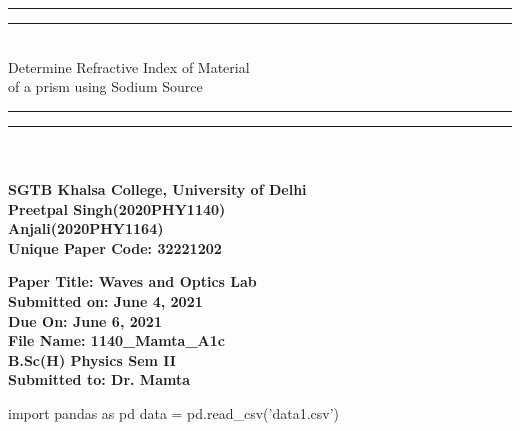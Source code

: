 \documentclass{article}
\begin{document}
\begin{center}


\rule{\textwidth}{1.6pt}\vspace*{-\baselineskip}\vspace*{2pt} %
\rule{\textwidth}{0.4pt}\\[\baselineskip] %

{\LARGE Determine Refractive Index of Material \\[0.2\baselineskip] of a prism using Sodium Source}%

\rule{\textwidth}{0.4pt}\vspace*{-\baselineskip}\vspace{3.2pt} %
\rule{\textwidth}{1.6pt}\\[2\baselineskip] %




\textbf{\Large \\[\baselineskip] SGTB Khalsa College, University of Delhi}\\[\baselineskip]
\textbf{\Large Preetpal Singh(2020PHY1140) \\[\baselineskip] Anjali(2020PHY1164)}\\[\baselineskip] 

\vspace*{\baselineskip}
\textbf{\Large Unique Paper Code: 32221202}\\[\baselineskip] 
\vspace*{\baselineskip}
 
\textbf{\Large Paper Title: Waves and Optics Lab}\\[\baselineskip] 
\vspace*{\baselineskip}
\textbf{\Large Submitted on: June 4, 2021}\\[\baselineskip] 
\vspace*{\baselineskip}
\textbf{\Large Due On: June 6, 2021}\\[\baselineskip] 
\vspace*{\baselineskip}
\textbf{\Large File Name: 1140\_Mamta\_A1c}\\[\baselineskip]
\vspace*{\baselineskip}
\textbf{\Large B.Sc(H) Physics Sem II}\\[\baselineskip] 
\vspace*{\baselineskip}
\vspace*{\baselineskip}
\textbf{\Large Submitted to: Dr. Mamta}\\[\baselineskip] 


\end{center}
\newpage
\begin{pycode}
import pandas as pd
data = pd.read_csv('data1.csv')
	
\end{pycode}
\end{document}
